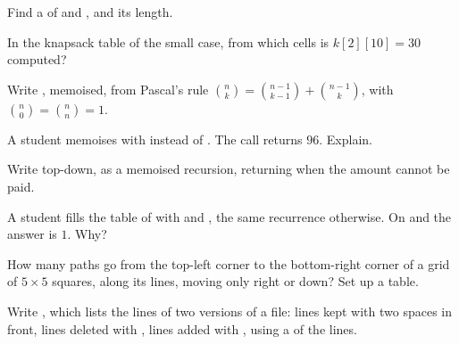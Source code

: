 \begin{exercise}[$\star$]\label{exo:g12:dynamic-programming:3}
Find a  of  and , and its length.
\end{exercise}

\begin{exercise}[$\star$]\label{exo:g12:dynamic-programming:4}
In the knapsack table of the small case, from which cells is $k[2][10] = 30$ computed?
\end{exercise}

\begin{exercise}[$\star$]\label{exo:g12:dynamic-programming:5}
Write , memoised, from Pascal's rule $\binom{n}{k} = \binom{n-1}{k-1} + \binom{n-1}{k}$, with
$\binom{n}{0} = \binom{n}{n} = 1$.
\end{exercise}

\begin{exercise}[$\star\star$]\label{exo:g12:dynamic-programming:6}
A student memoises  with  instead of . The call
 returns $96$. Explain.
\end{exercise}

\begin{exercise}[$\star\star$]\label{exo:g12:dynamic-programming:7}
Write  top-down, as a memoised recursion, returning  when the amount cannot
be paid.
\end{exercise}

\begin{exercise}[$\star\star$]\label{exo:g12:dynamic-programming:8}
A student fills the table of  with  and , the same
recurrence otherwise. On  and  the answer is $1$. Why?
\end{exercise}

\begin{exercise}[$\star\star$]\label{exo:g12:dynamic-programming:9}
How many paths go from the top-left corner to the bottom-right corner of a grid of $5 \times 5$ squares, along its
lines, moving only right or down? Set up a table.
\end{exercise}

\begin{exercise}[$\star\star$]\label{exo:g12:dynamic-programming:10}
Write , which lists the lines of two versions of a file: lines kept with two spaces in
front, lines deleted with \code{-}, lines added with \code{+}, using a  of the lines.
\end{exercise}

